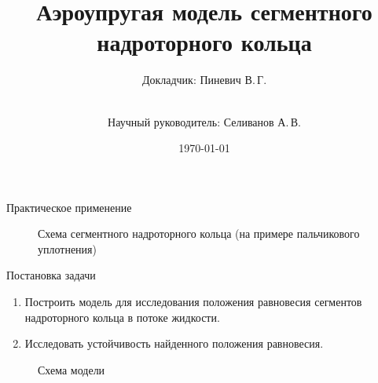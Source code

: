 \documentclass[ignoreonframetext,unicode]{beamer}
\title[Аэроупргугая модель]{Аэроупругая модель сегментного надроторного кольца}
\author[Пиневич В.\,Г.]{Докладчик: Пиневич В.\,Г.\and\\[0.5mm] Научный руководитель: Селиванов А.\,В.}
\institute[каф. Прикладная математика ФН-2]{группа ФН2-81Б}
\date{\today}
\begin{document}
	
	\begin{frame}[plain]
		\maketitle
	\end{frame}


	\begin{frame}{Практическое применение}
		\vspace*{-10mm}
		\begin{figure}[!htbp]
			\caption{Схема сегментного надроторного кольца (на примере пальчикового уплотнения)}
			\label{vved-2}
		\end{figure}
	\end{frame}

	\begin{frame}{Постановка задачи}
		\vspace*{2mm}
	\begin{enumerate}	
	\item Построить модель для исследования положения равновесия сегментов надроторного кольца в потоке жидкости.
	\item Исследовать устойчивость найденного положения равновесия.
\end{enumerate}
		
		\vspace*{-4mm}
	\begin{figure}[!htbp]
		\caption{Схема модели}
		\label{pruzina}
	\end{figure}	
		
	
		
	\end{frame}
\end{document}
